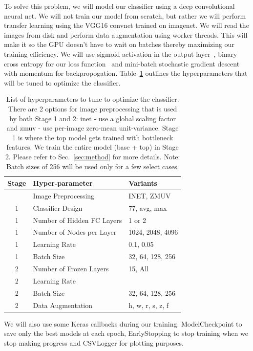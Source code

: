 \documentclass[12pt,journal,compsoc]{IEEEtran}
\begin{document}

To solve this problem, we will model our classifier using a deep convolutional neural net.  We will not train our model from scratch, but rather we will perform transfer learning using the VGG16 convnet trained on imagenet.  We will read the images from disk and perform data augmentation using worker threads.  This will make it so the GPU doesn't have to wait on batches thereby maximizing our training efficiency. We will use sigmoid activation in the output layer~\cite{Kurata:2016}, binary cross entropy for our loss function~\cite{deBoer2005} and mini-batch stochastic gradient descent with momentum for backpropogation. Table~\ref{tab:hyperparams} outlines the hyperparameters that will be tuned to optimize the classifier.
\begin{table}
\caption{List of hyperparameters to tune to optimize the classifier.  There are 2 options for image preprocessing that is used by both Stage 1 and 2: inet - use a global scaling factor and zmuv - use per-image zero-mean unit-variance.  Stage 1 is where the top model gets trained with bottleneck features.
We train the entire model (base + top) in Stage 2.  Please refer to Sec.~\ref{sec:method} for more details. Note: Batch sizes of 256 will be used only for a few select cases.}
\label{tab:hyperparams}
\begin{tabular}{cll}
\hline
Stage & Hyper-parameter & Variants \\
\hline
 & Image Preprocessing & INET, ZMUV \\
\hline
1 & Classifier Design & 77, avg, max \\
1 & Number of Hidden FC Layers & 1 or 2 \\
1 & Number of Nodes per Layer & 1024, 2048, 4096 \\
1 & Learning Rate & 0.1, 0.05\\
1 & Batch Size & 32, 64, 128, 256\\
\hline
2 & Number of Frozen Layers & 15, All \\
2 & Learning Rate & \\
2 & Batch Size & 32, 64, 128, 256 \\
2 & Data Augmentation & h, w, r, s, z, f \\
\hline
\end{tabular}
\end{table}
We will also use some Keras callbacks during our training.  ModelCheckpoint to save only the best models at each epoch, EarlyStopping to stop training when we stop making progress and CSVLogger for plotting purposes.
\end{document}
